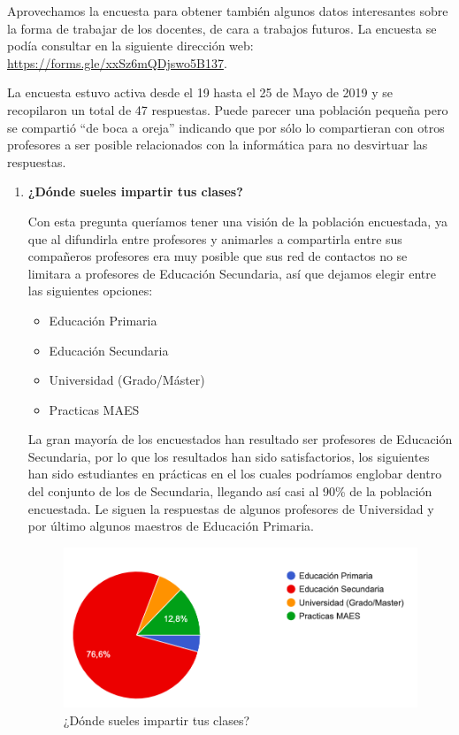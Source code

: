 \bigskip
Aprovechamos la encuesta para obtener también algunos datos interesantes sobre la forma de trabajar de los docentes, de cara a trabajos futuros. La encuesta se podía consultar en la siguiente dirección web: \url{https://forms.gle/xxSz6mQDjswo5B137}.

\bigskip
La encuesta estuvo activa desde el 19 hasta el 25 de Mayo de 2019 y se recopilaron un total de 47 respuestas. Puede parecer una población pequeña pero se compartió ``de boca a oreja'' indicando que por sólo lo compartieran con otros profesores a ser posible relacionados con la informática para no desvirtuar las respuestas.


\begin{enumerate}

\item \textbf{¿Dónde sueles impartir tus clases?}

Con esta pregunta queríamos tener una visión de la población encuestada, ya que al difundirla entre profesores y animarles a compartirla entre sus compañeros profesores era muy posible que sus red de contactos no se limitara a profesores de Educación Secundaria, así que dejamos elegir entre las siguientes opciones:

\begin{itemize}
    \item Educación Primaria
    \item Educación Secundaria
    \item Universidad (Grado/Máster)
    \item Practicas MAES
\end{itemize}

\bigskip
La gran mayoría de los encuestados han resultado ser profesores de Educación Secundaria, por lo que los resultados han sido satisfactorios, los siguientes han sido estudiantes en prácticas en el \master los cuales podríamos englobar dentro del conjunto de los de Secundaria, llegando así casi al 90\% de la población encuestada. Le siguen la respuestas de algunos profesores de Universidad y por último algunos maestros de Educación Primaria.

\begin{figure}[H]
\centering
\includegraphics[width=1.0\textwidth]{../images/quiz_1}
\caption{¿Dónde sueles impartir tus clases?}
\label{fig:quiz_1}
\end{figure}



\end{enumerate}

